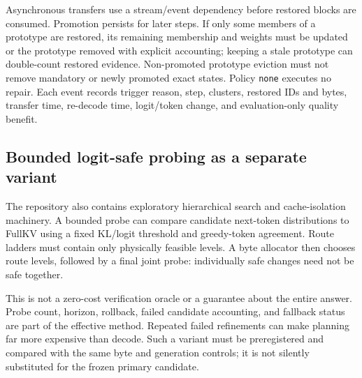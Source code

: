 Asynchronous transfers use a stream/event dependency before restored blocks
are consumed. Promotion persists for later steps. If only some members of a
prototype are restored, its remaining membership and weights must be updated
or the prototype removed with explicit accounting; keeping a stale prototype
can double-count restored evidence. Non-promoted prototype eviction must not
remove mandatory or newly promoted exact states. Policy \texttt{none} executes
no repair. Each event records trigger reason, step, clusters, restored IDs and
bytes, transfer time, re-decode time, logit/token change, and evaluation-only
quality benefit.

\subsection{Bounded logit-safe probing as a separate variant}
The repository also contains exploratory hierarchical search and cache-isolation
machinery. A bounded probe can compare candidate next-token distributions to
FullKV using a fixed KL/logit threshold and greedy-token agreement. Route
ladders must contain only physically feasible levels. A byte allocator then
chooses route levels, followed by a final joint probe: individually safe changes
need not be safe together.

This is not a zero-cost verification oracle or a guarantee about the entire
answer. Probe count, horizon, rollback, failed candidate accounting, and
fallback status are part of the effective method. Repeated failed refinements
can make planning far more expensive than decode. Such a variant must be
preregistered and compared with the same byte and generation controls; it is
not silently substituted for the frozen primary candidate.
